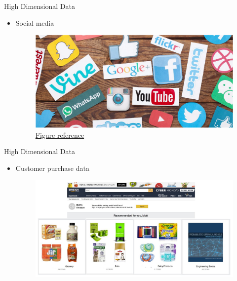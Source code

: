 \documentclass[serif, aspectratio=169]{beamer}
\begin{document}
\begin{frame}{High Dimensional Data}
    \begin{itemize}
        \item Social media
        \begin{figure}[htpb]
            \begin{center}
      \includegraphics[keepaspectratio, scale=0.4]{pic/social.png}
             \caption{\href{https://redeemedlifecounseling.com/why-we-share-everything-on-social-media/}{Figure reference}}
            \end{center}
        \end{figure}
    \end{itemize}
\end{frame}

\begin{frame}{High Dimensional Data}
    \begin{itemize}
        \item Customer purchase data
        \begin{figure}[htpb]
            \begin{center}
                \includegraphics[keepaspectratio, scale=0.4]{pic/customer_data.JPG}
            \end{center}
        \end{figure}
    \end{itemize}
\end{frame}
\end{document}
